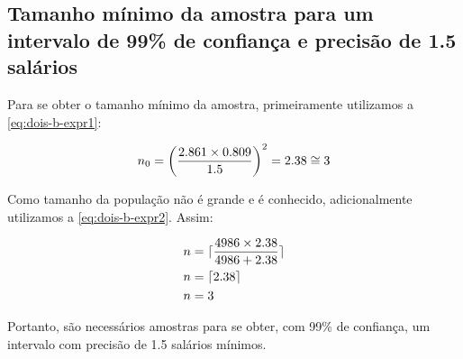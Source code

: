 \subsection{Tamanho mínimo da amostra para um intervalo de 99\% de confiança e precisão de 1.5 salários}
Para se obter o tamanho mínimo da amostra, primeiramente utilizamos a \autoref{eq:dois-b-expr1}:

\begin{align*}
	n_0 = \left (\frac{2.861 \times 0.809}{1.5} \right)^2 = 2.38 \cong 3
\end{align*}

Como tamanho da população não é grande e é conhecido, adicionalmente utilizamos a \autoref{eq:dois-b-expr2}. Assim:

\begin{align*}
		n &= \lceil \frac{4986 \times 2.38}{4986 + 2.38} \rceil \\
		n &= \lceil 2.38 \rceil \\
		n &= 3
\end{align*}

Portanto, são necessários \TRESnZeroCorrigidoRounded amostras para se obter, com 99\% de confiança,
um intervalo com precisão de 1.5 salários mínimos.
